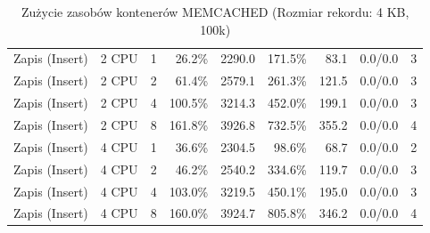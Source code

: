 \begin{table}[ht]
{\begin{tabular}{llcrrrrcc}
Zapis (Insert) & 2 CPU & 1 & 26.2\% & 2290.0 & 171.5\% & 83.1 & 0.0/0.0 & 3 \\
Zapis (Insert) & 2 CPU & 2 & 61.4\% & 2579.1 & 261.3\% & 121.5 & 0.0/0.0 & 3 \\
Zapis (Insert) & 2 CPU & 4 & 100.5\% & 3214.3 & 452.0\% & 199.1 & 0.0/0.0 & 3 \\
Zapis (Insert) & 2 CPU & 8 & 161.8\% & 3926.8 & 732.5\% & 355.2 & 0.0/0.0 & 4 \\
Zapis (Insert) & 4 CPU & 1 & 36.6\% & 2304.5 & 98.6\% & 68.7 & 0.0/0.0 & 2 \\
Zapis (Insert) & 4 CPU & 2 & 46.2\% & 2540.2 & 334.6\% & 119.7 & 0.0/0.0 & 3 \\
Zapis (Insert) & 4 CPU & 4 & 103.0\% & 3219.5 & 450.1\% & 195.0 & 0.0/0.0 & 3 \\
Zapis (Insert) & 4 CPU & 8 & 160.0\% & 3924.7 & 805.8\% & 346.2 & 0.0/0.0 & 4 \\
\bottomrule
\end{tabular}%
}
\caption{Zużycie zasobów kontenerów MEMCACHED (Rozmiar rekordu: 4 KB, 100k)}
\label{tab:resources_memcached_medium_100000}
\end{table}
